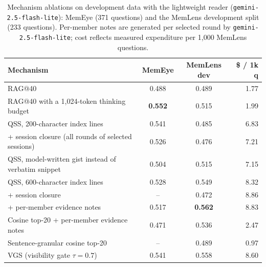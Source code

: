 \documentclass[10pt]{article}
\newcommand{\qss}{QSS}
\begin{document}
\begin{table}[t]
\centering
\caption{Mechanism ablations on development data with the lightweight reader (\texttt{gemini-2.5-flash-lite}): MemEye (371 questions) and the MemLens development split (233 questions). Per-member notes are generated per selected round by \texttt{gemini-2.5-flash-lite}; cost reflects measured expenditure per 1,000 MemLens questions.}
\label{tab:p5dev}
\small
\begin{tabular}{lccr}
\toprule
Mechanism & MemEye & MemLens dev & \$ / 1k q \\
\midrule
RAG@40 & 0.488 & 0.489 & 1.77 \\
RAG@40 with a 1,024-token thinking budget & \textbf{0.552} & 0.515 & 1.99 \\
\qss{}, 200-character index lines & 0.541 & 0.485 & 6.83 \\
\quad + session closure (all rounds of selected sessions) & 0.526 & 0.476 & 7.21 \\
\qss{}, model-written gist instead of verbatim snippet & 0.504 & 0.515 & 7.15 \\
\qss{}, 600-character index lines & 0.528 & 0.549 & 8.32 \\
\quad + session closure & -- & 0.472 & 8.86 \\
\quad + per-member evidence notes & 0.517 & \textbf{0.562} & 8.83 \\
Cosine top-20 + per-member evidence notes & 0.471 & 0.536 & 2.47 \\
Sentence-granular cosine top-20 & -- & 0.489 & 0.97 \\
VGS (visibility gate $\tau{=}0.7$) & 0.541 & 0.558 & 8.60 \\
\bottomrule
\end{tabular}
\end{table}
\end{document}
